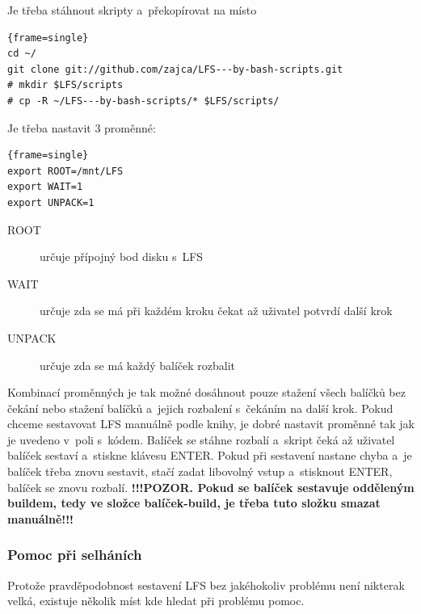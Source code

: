 \documentclass[a4paper,12pt]{article}
\renewcommand{\b}[1]{\textbf{#1}} %
\newenvironment{codeframe}{%
  \begin{Sbox} 
    \begin{minipage} 
      {\columnwidth-\leftmargin-\rightmargin-2\fboxsep-2\fboxrule-4pt} 
}{%

  \end{minipage} 
  \end{Sbox} 
  \begin{center} 
    \fcolorbox{black}{codeback}{\TheSbox} 
  \end{center} 
}
\begin{document}
Je třeba stáhnout skripty a~překopírovat na místo
    \begin{codeframe} 
\begin{Verbatim}{frame=single} 
cd ~/
git clone git://github.com/zajca/LFS---by-bash-scripts.git
# mkdir $LFS/scripts
# cp -R ~/LFS---by-bash-scripts/* $LFS/scripts/
\end{Verbatim} 
    \end{codeframe}

Je třeba nastavit 3 proměnné:
    \begin{codeframe} 
\begin{Verbatim}{frame=single} 
export ROOT=/mnt/LFS
export WAIT=1
export UNPACK=1
\end{Verbatim} 
    \end{codeframe}
\begin{description}
 \item[ROOT] určuje přípojný bod disku s~LFS
 \item[WAIT] určuje zda se má při každém kroku čekat až uživatel potvrdí další krok
 \item[UNPACK] určuje zda se má každý balíček rozbalit
\end{description}
Kombinací proměnných je tak možné dosáhnout pouze stažení všech balíčků bez čekání nebo stažení balíčků a~jejich rozbalení s~čekáním na další krok. Pokud chceme sestavovat LFS manuálně podle knihy, je dobré nastavit proměnné tak jak je uvedeno v~poli s~kódem. Balíček se stáhne rozbalí a~skript čeká až uživatel balíček sestaví a~stiskne klávesu ENTER. Pokud při sestavení nastane chyba a~je balíček třeba znovu sestavit, stačí zadat libovolný vstup a~stisknout ENTER, balíček se znovu rozbalí. \b{!!!POZOR. Pokud se balíček sestavuje odděleným buildem, tedy ve složce balíček-build, je třeba tuto složku smazat manuálně!!!}

\subsubsection{Pomoc při selháních}\label{sec:help}
Protože pravděpodobnost sestavení LFS bez jakéhokoliv problému není nikterak velká, existuje několik míst kde hledat při problému pomoc.
\end{document}
